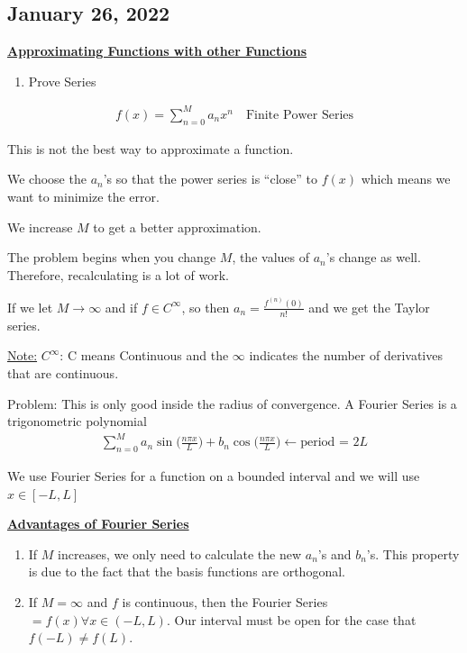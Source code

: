 \documentclass{article}
\newcommand{\topic}[1]{\textbf{\underline{#1}}}
\newcommand{\note}{\underline{Note:} }
\newcommand{\FS}{\sin \Big( \frac{n \pi x}{L} \Big)}
\newcommand{\FC}{\cos \Big( \frac{n \pi x}{L} \Big)}
\begin{document}
\subsection*{January 26, 2022}
\topic{Approximating Functions with other Functions}
\begin{enumerate}
  \item Prove Series
\end{enumerate}

  \begin{align}
    f(x) = \sum^M_{n = 0} a_n x^n \quad \text{Finite Power Series}
  \end{align}

  This is not the best way to approximate a function.

  We choose the $a_n$'s so that the power series is ``close'' to $f(x)$ which means we want to minimize the error.

  We increase $M$ to get a better approximation.

  The problem begins when you change $M$, the values of $a_n$'s change as well. Therefore, recalculating is a lot of work.

  If we let $M \to \infty$ and if $f \in C^\infty$, so then $a_n = \frac{f^{(n)}(0)}{n!}$ and we get the Taylor series.

  \note $C^\infty$: C means Continuous and the $\infty$ indicates the number of derivatives that are continuous.

  Problem: This is only good inside the radius of convergence.
  \bigbreak
  A Fourier Series is a trigonometric polynomial
  \begin{align}
    \sum_{n = 0}^M a_n \FS + b_n \FC \longleftarrow \text{period = } 2L
  \end{align}

  We use Fourier Series for a function on a bounded interval and we will use $x \in [-L, L]$

  \topic{Advantages of Fourier Series}
  \begin{enumerate}
    \item If $M$ increases, we only need to calculate the new $a_n$'s and $b_n$'s. This property is due to the fact that the basis functions are orthogonal.

    \item If $M = \infty$ and $f$ is continuous, then the Fourier Series $= f(x) \forall x \in (-L, L)$. Our interval must be open for the case that $f(-L) \neq f(L)$.
  \end{enumerate}
\end{document}

